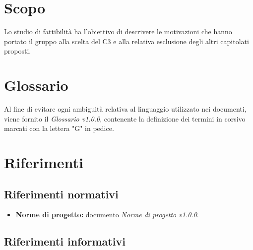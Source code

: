 \documentclass[openany,12pt,a4paper]{report}
\begin{document}
	\section{Scopo}

	Lo studio di fattibilità ha l’obiettivo di descrivere le motivazioni che hanno portato
	il gruppo alla scelta del  C3 e alla relativa esclusione degli altri capitolati proposti.

	\section{Glossario}

	Al fine di evitare ogni ambiguità relativa al linguaggio utilizzato nei documenti, viene fornito il \textit{Glossario v1.0.0}, contenente la definizione dei termini in corsivo marcati con la lettera "G" in pedice.

	\section{Riferimenti}

	\subsection{Riferimenti normativi}

	\begin{itemize}

		\item \textbf{Norme di progetto:} documento \textit{Norme di progetto v1.0.0}.

	\end{itemize}

	\subsection{Riferimenti informativi}
\end{document}
